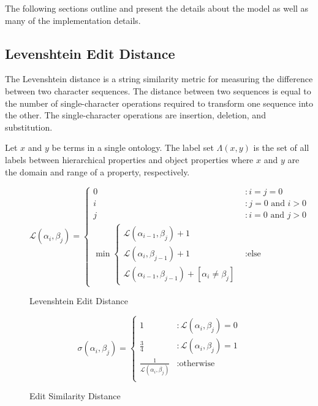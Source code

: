 \documentclass[letterpaper,twocolumn,12pt]{article}
\begin{document}
The following sections outline and present the details about the model as well as 
many of the implementation details.

\subsection{Levenshtein Edit Distance}

The Levenshtein distance is a string similarity metric for measuring the difference 
between two character sequences. 
The distance between two sequences is equal to the number of single-character 
operations required to transform one sequence into the other. 
The single-character operations are insertion, deletion, and substitution.

\begin{defn}
Let $x$ and $y$ be terms in a single ontology. The label set $\Lambda \left( x, y \right)$ is the set of all labels between hierarchical properties and object properties where $x$ and $y$ are the domain and range of a property, respectively.
\end{defn}

\begin{figure*}
\centering
\begin{equation*}
\mathcal{L} 
\left( \alpha_i, \beta_j \right) = \left\{
	\begin{array}{ll}
   	 	0 &: i=j=0 \\
		i &: j = 0 \text{ and } i > 0 \\
		j &: i = 0 \text{ and } j > 0 \\
		\min 
			\left\{ 
			\begin{array}{l}
				\mathcal{L} \left( \alpha_{i-1}, \beta_j \right) + 1 \\
          		        \mathcal{L} \left( \alpha_i, \beta_{j-1} \right) + 1 \\
          		        \mathcal{L} \left( \alpha_{i-1}, \beta_{j-1} \right) + [\alpha_i \neq \beta_j]
			\end{array} \right. &: \text{else}
     \end{array}
\right.
\end{equation*}
\caption{Levenshtein Edit Distance}
\end{figure*}

\begin{figure*}
\centering
\begin{equation*}
\sigma
\left( \alpha_i, \beta_j \right) = \left\{
\begin{array}{ll}
  1           &: \mathcal{L} \left( \alpha_i, \beta_j \right) = 0 \\
  \frac{3}{4} &: \mathcal{L} \left( \alpha_i, \beta_j \right) = 1 \\
  \frac{1}{\mathcal{L} \left( \alpha_i, \beta_j \right)} &: \text{otherwise} \\
\end{array}
\right.
\end{equation*}
\caption{Edit Similarity Distance}
\end{figure*}
\end{document}
